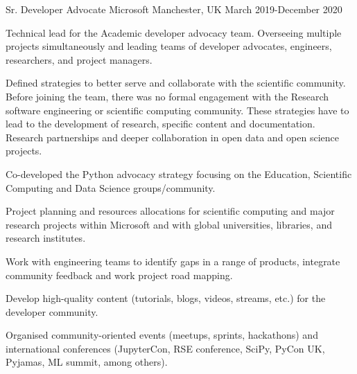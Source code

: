 \begin{cventries}
\cventry
{Sr. Developer Advocate} %
{Microsoft} %
{Manchester, UK} %
{March 2019-December 2020 } %
{ %
\begin{cvitems}
\item {Technical lead for the Academic developer advocacy team. Overseeing multiple projects simultaneously and leading teams of developer advocates, engineers, researchers,  and project managers.}
\item {Defined strategies to better serve and collaborate with the scientific community. Before joining the team, there was no formal engagement with the Research software engineering or scientific computing community. These strategies have to lead to the development of research, specific content and documentation. Research partnerships and deeper collaboration in open data and open science projects.}
\item {Co-developed the Python advocacy strategy focusing on the Education, Scientific Computing and Data Science groups/community.}
\item{Project planning and resources allocations for scientific computing and major research projects within Microsoft and with global universities, libraries, and research institutes. }
\item {Work with engineering teams to identify gaps in a range of products, integrate community feedback and work project road mapping.}
\item {Develop high-quality content (tutorials, blogs, videos, streams, etc.) for the developer community.}
\item {Organised community-oriented events (meetups, sprints, hackathons) and international conferences (JupyterCon, RSE conference, SciPy, PyCon UK, Pyjamas, ML summit, among others).}
\end{cvitems}
}



\end{cventries}
